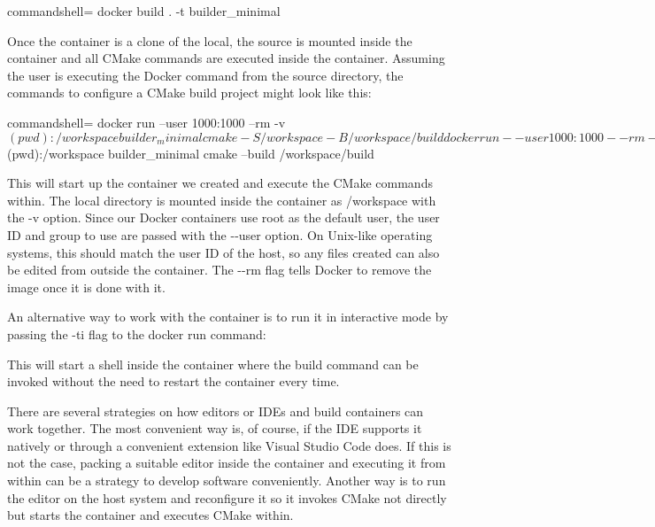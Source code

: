 \begin{tcblisting}{commandshell={}}
docker build . -t builder_minimal
\end{tcblisting}

Once the container is a clone of the local, the source is mounted inside the container and all CMake commands are executed inside the container. Assuming the user is executing the Docker command from the source directory, the commands to configure a CMake build project might look like this:

\begin{tcblisting}{commandshell={}}
docker run --user 1000:1000 --rm -v $(pwd):/workspace
  builder_minimal cmake -S /workspace -B /workspace/build
docker run --user 1000:1000 --rm -v $(pwd):/workspace
  builder_minimal cmake --build /workspace/build
\end{tcblisting}

This will start up the container we created and execute the CMake commands within. The local directory is mounted inside the container as /workspace with the -v option. Since our Docker containers use root as the default user, the user ID and group to use are passed with the -{}-user option. On Unix-like operating systems, this should match the user ID of the host, so any files created can also be edited from outside the container. The -{}-rm flag tells Docker to remove the image once it is done with it.

An alternative way to work with the container is to run it in interactive mode by passing the -ti flag to the docker run command:


This will start a shell inside the container where the build command can be invoked without the need to restart the container every time.

There are several strategies on how editors or IDEs and build containers can work together. The most convenient way is, of course, if the IDE supports it natively or through a convenient extension like Visual Studio Code does. If this is not the case, packing a suitable editor inside the container and executing it from within can be a strategy to develop software conveniently. Another way is to run the editor on the host system and reconfigure it so it invokes CMake not directly but starts the container and executes CMake within.

